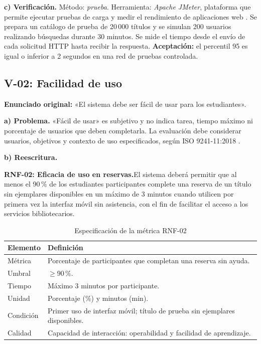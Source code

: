 \documentclass[conference,onecolumn]{IEEEtran}
\newcommand{\req}[1]{\par\noindent\textbf{#1.}\hspace{0.5em}}
\begin{document}
\textbf{c) Verificación.} Método: \emph{prueba}. Herramienta: \emph{Apache JMeter}, plataforma que permite ejecutar pruebas de carga y medir el rendimiento de aplicaciones web \cite{jmeter}. Se prepara un catálogo de prueba de 20\,000 títulos y se simulan 200 usuarios realizando búsquedas durante 30 minutos. Se mide el tiempo desde el envío de cada solicitud HTTP hasta recibir la respuesta. \textbf{Aceptación:} el percentil 95 es igual o inferior a 2 segundos en una red de pruebas controlada.

\subsection{V-02: Facilidad de uso}
\textbf{Enunciado original:} «El sistema debe ser fácil de usar para los estudiantes».

\textbf{a) Problema.} «Fácil de usar» es subjetivo y no indica tarea, tiempo máximo ni porcentaje de usuarios que deben completarla. La evaluación debe considerar usuarios, objetivos y contexto de uso especificados, según ISO 9241-11:2018 \cite{iso9241_11}.

\textbf{b) Reescritura.}
\req{RNF-02: Eficacia de uso en reservas}El sistema deberá permitir que al menos el 90\,\% de los estudiantes participantes complete una reserva de un título sin ejemplares disponibles en un máximo de 3 minutos cuando utilicen por primera vez la interfaz móvil sin asistencia, con el fin de facilitar el acceso a los servicios bibliotecarios.

\begin{table}[H]
\caption{Especificación de la métrica RNF-02}
\label{tab:rnf2}
\footnotesize\centering
\begin{tabularx}{\columnwidth}{@{}p{}Y@{}}
\toprule
\textbf{Elemento} & \textbf{Definición}\\
\midrule
Métrica & Porcentaje de participantes que completan una reserva sin ayuda.\\
Umbral & $\geq 90\,\%$.\\
Tiempo & Máximo 3 minutos por participante.\\
Unidad & Porcentaje (\%) y minutos (min).\\
Condición & Primer uso de interfaz móvil; título de prueba sin ejemplares disponibles.\\
Calidad & Capacidad de interacción: operabilidad y facilidad de aprendizaje.\\
\bottomrule
\end{tabularx}
\end{table}
\end{document}

